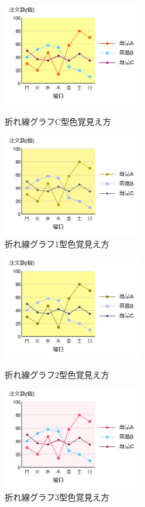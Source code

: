 \documentclass[titlepage]{jlreq}
\begin{document}
\begin{figure}[H]
    \begin{minipage}[b]{0.49\columnwidth}
        \includegraphics[width=6cm]{line_fixed.png}
        \centering
        \caption{折れ線グラフC型色覚見え方}
    \end{minipage}
    \begin{minipage}[b]{0.49\columnwidth}
        \includegraphics[width=6cm]{line_fixed_deuteranope.png}
        \centering
        \caption{折れ線グラフ1型色覚見え方}
    \end{minipage}
\end{figure}

\begin{figure}[H]
    \begin{minipage}[b]{0.49\columnwidth}
        \includegraphics[width=6cm]{line_fixed_protanope.png}
        \centering
        \caption{折れ線グラフ2型色覚見え方}
    \end{minipage}
    \begin{minipage}[b]{0.49\columnwidth}
        \includegraphics[width=6cm]{line_fixed_tritanope.png}
        \centering
        \caption{折れ線グラフ3型色覚見え方}
    \end{minipage}
\end{figure}
\end{document}
